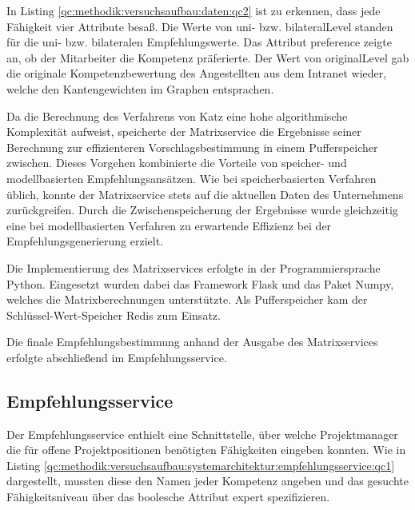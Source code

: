 In Listing \ref{qc:methodik:versuchsaufbau:daten:qc2} ist zu erkennen, dass jede Fähigkeit vier Attribute besaß. Die Werte von uni- bzw. bilateralLevel standen für die uni- bzw. bilateralen Empfehlungswerte. Das Attribut preference zeigte an, ob der Mitarbeiter die Kompetenz präferierte. Der Wert von originalLevel gab die originale Kompetenzbewertung des Angestellten aus dem Intranet wieder, welche den Kantengewichten im Graphen entsprachen.

Da die Berechnung des Verfahrens von Katz eine hohe algorithmische Komplexität aufweist, speicherte der Matrixservice die Ergebnisse seiner Berechnung zur effizienteren Vorschlagsbestimmung in einem Pufferspeicher zwischen. Dieses Vorgehen kombinierte die Vorteile von speicher- und modellbasierten Empfehlungsansätzen. Wie bei speicherbasierten Verfahren üblich, konnte der Matrixservice stets auf die aktuellen Daten des Unternehmens zurückgreifen. Durch die Zwischenspeicherung der Ergebnisse wurde gleichzeitig eine bei modellbasierten Verfahren zu erwartende Effizienz bei der Empfehlungsgenerierung erzielt.

Die Implementierung des Matrixservices erfolgte in der Programmiersprache Python. Eingesetzt wurden dabei das Framework Flask und das Paket Numpy, welches die Matrixberechnungen unterstützte. Als Pufferspeicher kam der Schlüssel-Wert-Speicher Redis zum Einsatz.

Die finale Empfehlungsbestimmung anhand der Ausgabe des Matrixservices erfolgte abschließend im Empfehlungsservice.

\subsection{Empfehlungsservice}
\label{ch:methodik:versuchsaufbau:systemarchitektur:empfehlungsservice}
Der Empfehlungsservice enthielt eine Schnittstelle, über welche Projektmanager die für offene Projektpositionen benötigten Fähigkeiten eingeben konnten. Wie in Listing \ref{qc:methodik:versuchsaufbau:systemarchitektur:empfehlungsservice:qc1} dargestellt, mussten diese den Namen jeder Kompetenz angeben und das gesuchte Fähigkeitsniveau über das boolesche Attribut expert spezifizieren.



